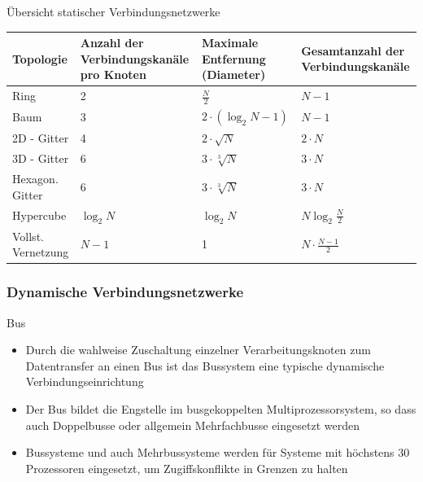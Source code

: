\begin{bonus}{Übersicht statischer Verbindungsnetzwerke}
    \begin{tabularx}{\textwidth}{|l|X|X|X|}
        \toprule
        Topologie          & Anzahl der Verbindungskanäle pro Knoten & Maximale Entfernung (Diameter) & Gesamtanzahl der Verbindungskanäle \\
        \midrule
        Ring               & 2                                       & $\frac{N}{2}$                  & $N-1$                              \\
        \midrule
        Baum               & 3                                       & $2\cdot (\log_2 N - 1)$        & $N-1$                              \\
        \midrule
        2D - Gitter        & 4                                       & $2\cdot \sqrt{N}$              & $2\cdot N$                         \\
        \midrule
        3D - Gitter        & 6                                       & $3\cdot \sqrt[3]{N}$           & $3\cdot N$                         \\
        \midrule
        Hexagon. Gitter    & 6                                       & $3\cdot \sqrt[3]{N}$           & $3\cdot N$                         \\ 
        \midrule
        Hypercube          & $\log_2 N$                              & $\log_2 N$                     & $N \log_2 \frac{N}{2}$             \\
        \midrule
        Vollst. Vernetzung & $N - 1$                                 & 1                              & $N \cdot \frac{N-1}{2}$            \\
        \bottomrule
    \end{tabularx}
\end{bonus}

\subsubsection{Dynamische Verbindungsnetzwerke}

\begin{defi}{Bus}
    \begin{itemize}
        \item Durch die wahlweise Zuschaltung einzelner Verarbeitungsknoten zum Datentransfer an einen Bus ist das Bussystem eine typische dynamische Verbindungseinrichtung
        \item Der Bus bildet die Engstelle im busgekoppelten Multiprozessorsystem,
              so dass auch Doppelbusse oder allgemein Mehrfachbusse eingesetzt werden
        \item Bussysteme und auch Mehrbussysteme werden für Systeme mit höchstens 30 Prozessoren eingesetzt,
              um Zugiffskonflikte in Grenzen zu halten
    \end{itemize}
\end{defi}

